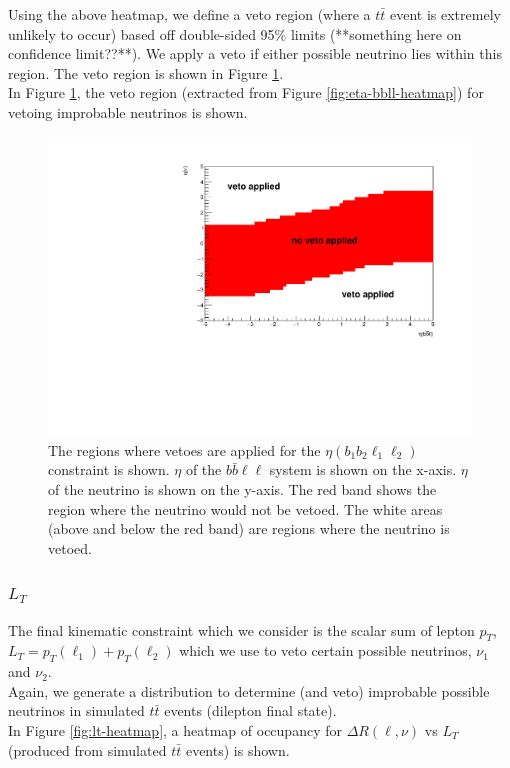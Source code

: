 Using the above heatmap, we define a veto region (where a $t\bar{t}$ event is extremely unlikely to occur) based off double-sided 95$\%$ limits (**something here on confidence limit??**). We apply a veto if either possible neutrino lies within this region. The veto region is shown in Figure \ref{fig:eta-bbll-vetoes}.\\

In Figure \ref{fig:eta-bbll-vetoes}, the veto region (extracted from Figure \ref{fig:eta-bbll-heatmap}) for vetoing improbable neutrinos is shown.

\begin{figure}[h!]
	\includegraphics[width=0.6\linewidth]{figures/bbll_veto_2vSM.pdf}
	\centering
	\caption{The regions where vetoes are applied for the $\eta(b_{1}b_{2}\ell_{1}\ell_{2})$ constraint is shown. $\eta$ of the $b\bar{b}\ell\ell$ system is shown on the x-axis. $\eta$ of the neutrino is shown on the y-axis. The red band shows the region where the neutrino would not be vetoed. The white areas (above and below the red band) are regions where the neutrino is vetoed.}
	\label{fig:eta-bbll-vetoes}
\end{figure}

\subsubsection{$L_{T}$}

The final kinematic constraint which we consider is the scalar sum of lepton $p_{T}$, $L_{T} = p_{T}(\ell_{1}) + p_{T}(\ell_{2})$ which we use to veto certain possible neutrinos, $\nu_{1}$ and $\nu_{2}$.\\

Again, we generate a distribution to determine (and veto) improbable possible neutrinos in simulated $t\bar{t}$ events (dilepton final state).\\
In Figure \ref{fig:lt-heatmap}, a heatmap of occupancy for $\Delta R (\ell, \nu)$ vs $L_{T}$ (produced from simulated $t\bar{t}$ events) is shown. 


